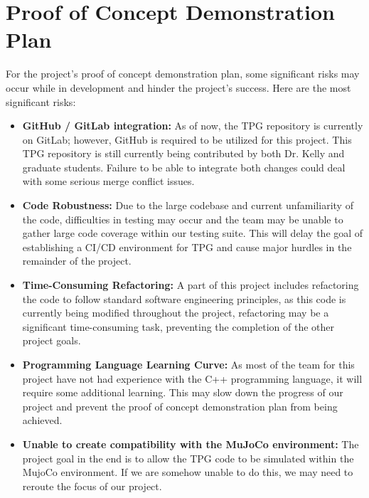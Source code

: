 \documentclass{article}
\begin{document}

\section{Proof of Concept Demonstration Plan}


For the project's proof of concept demonstration plan, some significant risks may occur while in development and hinder the project's success. Here are the most significant risks:
\begin{itemize}
  \item \textbf{GitHub / GitLab integration:} As of now, the TPG repository is currently on GitLab; however, GitHub is required to be utilized for this project. This TPG repository is still currently being contributed by both Dr. Kelly and graduate students. Failure to be able to integrate both changes could deal with some serious merge conflict issues.
  \item \textbf{Code Robustness:} Due to the large codebase and current unfamiliarity of the code, difficulties in testing may occur and the team may be unable to gather large code coverage within our testing suite. This will delay the goal of establishing a CI/CD environment for TPG and cause major hurdles in the remainder of the project.
  \item \textbf{Time-Consuming Refactoring:} A part of this project includes refactoring the code to follow standard software engineering principles, as this code is currently being modified throughout the project, refactoring may be a significant time-consuming task, preventing the completion of the other project goals.
  \item \textbf{Programming Language Learning Curve:} As most of the team for this project have not had experience with the C++ programming language, it will require some additional learning. This may slow down the progress of our project and prevent the proof of concept demonstration plan from being achieved.
  \item \textbf{Unable to create compatibility with the MuJoCo environment:} The project goal in the end is to allow the TPG code to be simulated within the MujoCo environment. If we are somehow unable to do this, we may need to reroute the focus of our project.
\end{itemize}
\end{document}
